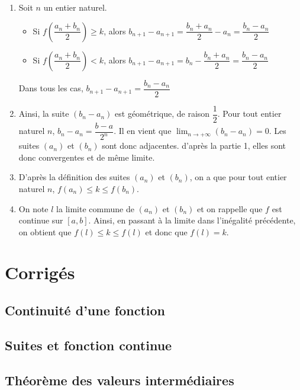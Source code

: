 \documentclass[11pt,fleqn, openany]{book} %
\begin{document}
\begin{solution}
\begin{enumerate}
\item Soit $n$ un entier naturel.
\begin{itemize}
\item Si $ f\left(\dfrac{a_n+b_n}{2}\right) \geqslant k$, alors $b_{n+1}-a_{n+1}=\dfrac{b_n+a_n}{2}-a_n=\dfrac{b_n-a_n}{2}$
\item Si $ f\left(\dfrac{a_n+b_n}{2}\right) < k$, alors $b_{n+1}-a_{n+1}=b_n-\dfrac{b_n+a_n}{2}=\dfrac{b_n-a_n}{2}$
\end{itemize}
Dans tous les cas, $b_{n+1}-a_{n+1}=\dfrac{b_n-a_n}{2}$
\item Ainsi, la suite $(b_n-a_n)$ est géométrique, de raison $\dfrac{1}{2}$. Pour tout entier naturel $n$, $b_n-a_n=\dfrac{b-a}{2^n}$. Il en vient que $\displaystyle\lim_{n \to + \infty}(b_n-a_n)=0$. Les suites $(a_n)$ et $(b_n)$ sont donc adjacentes. d'après la partie 1, elles sont donc convergentes et de même limite.
\item D'après la définition des suites $(a_n)$ et $(b_n)$, on a que pour tout entier naturel $n$, $f(a_n) \leqslant k \leqslant f(b_n)$.
\item On note $l$ la limite commune de $(a_n)$ et $(b_n)$ et on rappelle que $f$ est continue sur $[a,b]$. Ainsi, en passant à la limite dans l'inégalité précédente, on obtient que $f(l) \leqslant k \leqslant f(l)$ et donc que $f(l)=k$.
\end{enumerate}

\end{solution}


\chapter{Corrigés}

\section*{Continuité d'une fonction}

\printsolutions[collection={cont01}, headings={false} ]

\section*{Suites et fonction continue}

\printsolutions[collection={cont02}, headings={false} ]

\section*{Théorème des valeurs intermédiaires}

\printsolutions[collection={cont03}, headings={false} ]
\end{document}

